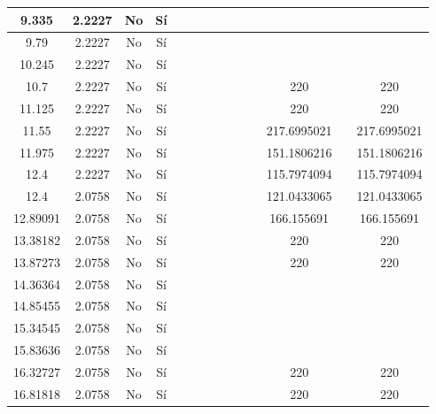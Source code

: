\begin{table}[H]
{\begin{tabular}{|c|c|c|c|c|c|c|c|c|c|c|c|c|c|}
\hline
9.335 & 2.2227 & No  & Sí  &     &     &     &     &     &     &     &     &     &  \bigstrut\\
\hline
9.79 & 2.2227 & No  & Sí  &     &     &     &     &     &     &     &     &     &  \bigstrut\\
\hline
10.245 & 2.2227 & No  & Sí  &     &     &     &     &     &     &     &     &     &  \bigstrut\\
\hline
10.7 & 2.2227 & No  & Sí  &     &     &     &     &     &     &     & 220 &     & 220 \bigstrut\\
\hline
11.125 & 2.2227 & No  & Sí  &     &     &     &     &     &     &     & 220 &     & 220 \bigstrut\\
\hline
11.55 & 2.2227 & No  & Sí  &     &     &     &     &     &     &     & 217.6995021 &     & 217.6995021 \bigstrut\\
\hline
11.975 & 2.2227 & No  & Sí  &     &     &     &     &     &     &     & 151.1806216 &     & 151.1806216 \bigstrut\\
\hline
12.4 & 2.2227 & No  & Sí  &     &     &     &     &     &     &     & 115.7974094 &     & 115.7974094 \bigstrut\\
\hline
12.4 & 2.0758 & No  & Sí  &     &     &     &     &     &     &     & 121.0433065 &     & 121.0433065 \bigstrut\\
\hline
12.89091 & 2.0758 & No  & Sí  &     &     &     &     &     &     &     & 166.155691 &     & 166.155691 \bigstrut\\
\hline
13.38182 & 2.0758 & No  & Sí  &     &     &     &     &     &     &     & 220 &     & 220 \bigstrut\\
\hline
13.87273 & 2.0758 & No  & Sí  &     &     &     &     &     &     &     & 220 &     & 220 \bigstrut\\
\hline
14.36364 & 2.0758 & No  & Sí  &     &     &     &     &     &     &     &     &     &  \bigstrut\\
\hline
14.85455 & 2.0758 & No  & Sí  &     &     &     &     &     &     &     &     &     &  \bigstrut\\
\hline
15.34545 & 2.0758 & No  & Sí  &     &     &     &     &     &     &     &     &     &  \bigstrut\\
\hline
15.83636 & 2.0758 & No  & Sí  &     &     &     &     &     &     &     &     &     &  \bigstrut\\
\hline
16.32727 & 2.0758 & No  & Sí  &     &     &     &     &     &     &     & 220 &     & 220 \bigstrut\\
\hline
16.81818 & 2.0758 & No  & Sí  &     &     &     &     &     &     &     & 220 &     & 220 \bigstrut\\

\end{tabular}}
\end{table}
